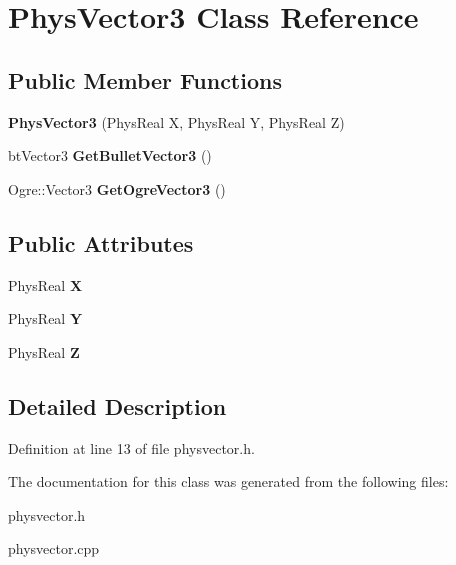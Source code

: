 \hypertarget{classPhysVector3}{
\section{PhysVector3 Class Reference}
\label{da/d11/classPhysVector3}
}
\subsection*{Public Member Functions}
\begin{DoxyCompactItemize}
\item 
\hypertarget{classPhysVector3_aad8161121a45b20dde0e3cc6959801be}{
{\bfseries PhysVector3} (PhysReal X, PhysReal Y, PhysReal Z)}
\label{da/d11/classPhysVector3_aad8161121a45b20dde0e3cc6959801be}

\item 
\hypertarget{classPhysVector3_adfc5f9e933a94be994ce5ce0c38d1f96}{
btVector3 {\bfseries GetBulletVector3} ()}
\label{da/d11/classPhysVector3_adfc5f9e933a94be994ce5ce0c38d1f96}

\item 
\hypertarget{classPhysVector3_a01facc2b865bb79c589ed1985dd6c49c}{
Ogre::Vector3 {\bfseries GetOgreVector3} ()}
\label{da/d11/classPhysVector3_a01facc2b865bb79c589ed1985dd6c49c}

\end{DoxyCompactItemize}
\subsection*{Public Attributes}
\begin{DoxyCompactItemize}
\item 
\hypertarget{classPhysVector3_ac4586254a6116c616046bd9d5b35ca31}{
PhysReal {\bfseries X}}
\label{da/d11/classPhysVector3_ac4586254a6116c616046bd9d5b35ca31}

\item 
\hypertarget{classPhysVector3_a9bf4609392a492c2b3e278d635ed976a}{
PhysReal {\bfseries Y}}
\label{da/d11/classPhysVector3_a9bf4609392a492c2b3e278d635ed976a}

\item 
\hypertarget{classPhysVector3_a0c0585976cb4c215626e205a2c663226}{
PhysReal {\bfseries Z}}
\label{da/d11/classPhysVector3_a0c0585976cb4c215626e205a2c663226}

\end{DoxyCompactItemize}


\subsection{Detailed Description}


Definition at line 13 of file physvector.h.

The documentation for this class was generated from the following files:\begin{DoxyCompactItemize}
\item 
physvector.h\item 
physvector.cpp\end{DoxyCompactItemize}
